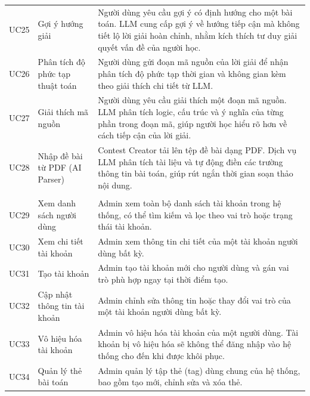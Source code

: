 \documentclass[12pt, a4paper]{report}
\begin{document}
\begin{longtable}{|>{\centering\arraybackslash}p{1.5cm}|>{\raggedright\arraybackslash}p{4.2cm}|>{\raggedright\arraybackslash}p{7.8cm}|}
  \multicolumn{3}{|l|}{\textbf{Nhóm 5: Hỗ trợ học tập bằng LLM}} \\
  \hline
  UC25 & Gợi ý hướng giải &
    Người dùng yêu cầu gợi ý có định hướng cho một bài toán. \ac{LLM} cung cấp gợi ý về
    hướng tiếp cận mà không tiết lộ lời giải hoàn chỉnh, nhằm kích thích tư duy giải quyết
    vấn đề của người học. \\
  \hline
  UC26 & Phân tích độ phức tạp thuật toán &
    Người dùng gửi đoạn mã nguồn của lời giải để nhận phân tích độ phức tạp thời gian và
    không gian kèm theo giải thích chi tiết từ \ac{LLM}. \\
  \hline
  UC27 & Giải thích mã nguồn &
    Người dùng yêu cầu giải thích một đoạn mã nguồn. \ac{LLM} phân tích logic, cấu trúc và
    ý nghĩa của từng phần trong đoạn mã, giúp người học hiểu rõ hơn về cách tiếp cận của
    lời giải. \\
  \hline
  UC28 & Nhập đề bài từ PDF (AI Parser) &
    Contest Creator tải lên tệp đề bài dạng \ac{PDF}. Dịch vụ \ac{LLM} phân tích tài liệu
    và tự động điền các trường thông tin bài toán, giúp rút ngắn thời gian soạn thảo nội
    dung. \\
  \hline

  \multicolumn{3}{|l|}{\textbf{Nhóm 6: Quản trị hệ thống (Admin)}} \\
  \hline
  UC29 & Xem danh sách người dùng &
    Admin xem toàn bộ danh sách tài khoản trong hệ thống, có thể tìm kiếm và lọc theo vai
    trò hoặc trạng thái tài khoản. \\
  \hline
  UC30 & Xem chi tiết tài khoản &
    Admin xem thông tin chi tiết của một tài khoản người dùng bất kỳ. \\
  \hline
  UC31 & Tạo tài khoản &
    Admin tạo tài khoản mới cho người dùng và gán vai trò phù hợp ngay tại thời điểm tạo.
    \\
  \hline
  UC32 & Cập nhật thông tin tài khoản &
    Admin chỉnh sửa thông tin hoặc thay đổi vai trò của một tài khoản người dùng bất kỳ.
    \\
  \hline
  UC33 & Vô hiệu hóa tài khoản &
    Admin vô hiệu hóa tài khoản của một người dùng. Tài khoản bị vô hiệu hóa sẽ không thể
    đăng nhập vào hệ thống cho đến khi được khôi phục. \\
  \hline
  UC34 & Quản lý thẻ bài toán &
    Admin quản lý tập thẻ (tag) dùng chung của hệ thống, bao gồm tạo mới, chỉnh sửa và
    xóa thẻ. \\
  \hline


\end{longtable}
\end{document}
